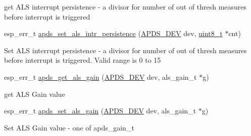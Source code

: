\begin{DoxyCompactItemize}
\begin{DoxyCompactList}\small\item\em 
\begin{DoxyItemize}
\item get A\+LS interrupt persistence -\/ a divisor for number of out of thresh measures before interrupt is triggered 
\end{DoxyItemize}\end{DoxyCompactList}\item 
esp\+\_\+err\+\_\+t \hyperlink{group__APDS9960__ALSFunctions_ga004d0bfdb06f9a8021ddc970e27f56c6}{apds\+\_\+set\+\_\+als\+\_\+intr\+\_\+persistence} (\hyperlink{structAPDS9960__Driver}{A\+P\+D\+S\+\_\+\+D\+EV} dev, \hyperlink{vl53l0x__types_8h_aba7bc1797add20fe3efdf37ced1182c5}{uint8\+\_\+t} $\ast$cnt)
\begin{DoxyCompactList}\small\item\em 
\begin{DoxyItemize}
\item Set A\+LS interrupt persistence -\/ a divisor for number of out of thresh measures before interrupt is triggered. Valid range is 0 to 15 
\end{DoxyItemize}\end{DoxyCompactList}\item 
esp\+\_\+err\+\_\+t \hyperlink{group__APDS9960__ALSFunctions_ga7e50d65cb6156191e03906ccc44e348e}{apds\+\_\+get\+\_\+als\+\_\+gain} (\hyperlink{structAPDS9960__Driver}{A\+P\+D\+S\+\_\+\+D\+EV} dev, als\+\_\+gain\+\_\+t $\ast$g)
\begin{DoxyCompactList}\small\item\em 
\begin{DoxyItemize}
\item get A\+LS Gain value 
\end{DoxyItemize}\end{DoxyCompactList}\item 
esp\+\_\+err\+\_\+t \hyperlink{group__APDS9960__ALSFunctions_ga11ad5a3f974f5e881bf74cf7c4483333}{apds\+\_\+set\+\_\+als\+\_\+gain} (\hyperlink{structAPDS9960__Driver}{A\+P\+D\+S\+\_\+\+D\+EV} dev, als\+\_\+gain\+\_\+t $\ast$g)
\begin{DoxyCompactList}\small\item\em 
\begin{DoxyItemize}
\item Set A\+LS Gain value -\/ one of apds\+\_\+gain\+\_\+t 
\end{DoxyItemize}\end{DoxyCompactList}\end{DoxyCompactItemize}


